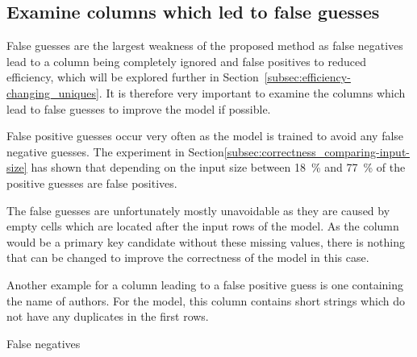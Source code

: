 \subsection{Examine columns which led to false guesses}\label{subsec:correctness_examine-false-guesses} %
False guesses are the largest weakness of the proposed method as false negatives lead to a column being completely ignored and false positives to reduced efficiency, which will be explored further in Section~\ref{subsec:efficiency-changing_uniques}. It is therefore very important to examine the columns which lead to false guesses to improve the model if possible.

False positive guesses occur very often as the model is trained to avoid any false negative guesses. The experiment in Section\ref{subsec:correctness_comparing-input-size} has shown that depending on the input size between \SI{18}{\percent} and \SI{77}{\percent} of the positive guesses are false positives. %

The false guesses are unfortunately mostly unavoidable as they are caused by empty cells which are located after the input rows of the model. As the column would be a primary key candidate without these missing values, there is nothing that can be changed to improve the correctness of the model in this case.

Another example for a column leading to a false positive guess is one containing the name of authors. For the model, this column contains short strings which do not have any duplicates in the first rows. %

False negatives

